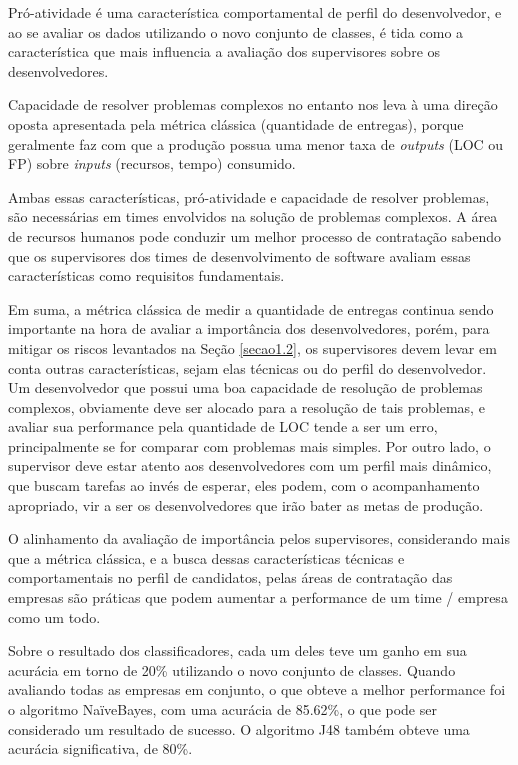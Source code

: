 Pró-atividade é uma característica comportamental de perfil do desenvolvedor,  e ao se avaliar os dados utilizando o novo conjunto de classes, é tida como a característica que mais influencia a avaliação dos supervisores sobre os desenvolvedores.

Capacidade de resolver problemas complexos no entanto nos leva à uma direção oposta apresentada pela métrica clássica (quantidade de entregas), porque geralmente faz com que a produção possua uma menor taxa de \textit{outputs} (LOC ou FP) sobre \textit{inputs} (recursos, tempo) consumido.

Ambas essas características, pró-atividade e capacidade de resolver problemas, são necessárias em times envolvidos na solução de problemas complexos. A área de recursos humanos pode conduzir um melhor processo de contratação sabendo que os supervisores dos times de desenvolvimento de software avaliam essas características como requisitos fundamentais.

Em suma, a métrica clássica de medir a quantidade de entregas continua sendo importante na hora de avaliar a importância dos desenvolvedores, porém, para mitigar os riscos levantados na Seção \ref{secao1.2}, os supervisores devem levar em conta outras características, sejam elas técnicas ou do perfil do desenvolvedor. Um desenvolvedor que possui uma boa capacidade de resolução de problemas complexos, obviamente deve ser alocado para a resolução de tais problemas, e avaliar sua performance pela quantidade de LOC tende a ser um erro, principalmente se for comparar com problemas mais simples. Por outro lado, o supervisor deve estar atento aos desenvolvedores com um perfil mais dinâmico, que buscam tarefas ao invés de esperar, eles podem, com o acompanhamento apropriado, vir a ser os desenvolvedores que irão bater as metas de produção.

O alinhamento da avaliação de importância pelos supervisores, considerando mais que a métrica clássica, e a busca dessas características técnicas e comportamentais no perfil de candidatos, pelas áreas de contratação das empresas são práticas que podem aumentar a performance de um time / empresa como um todo.

Sobre o resultado dos classificadores, cada um deles teve um ganho em sua acurácia em torno de 20\% utilizando o novo conjunto de classes. Quando avaliando todas as empresas em conjunto, o que obteve a melhor performance foi o algoritmo NaïveBayes, com uma acurácia de 85.62\%, o que pode ser considerado um resultado de sucesso. O algoritmo J48 também obteve uma acurácia significativa, de 80\%. 

